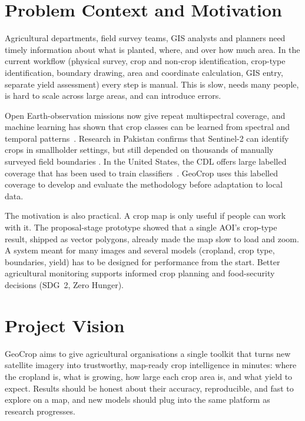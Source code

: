 \section{Problem Context and Motivation}
Agricultural departments, field survey teams, GIS analysts and planners need timely information
about what is planted, where, and over how much area. In the current workflow (physical survey,
crop and non-crop identification, crop-type identification, boundary drawing, area and coordinate
calculation, GIS entry, separate yield assessment) every step is manual. This is slow, needs many
people, is hard to scale across large areas, and can introduce errors.

Open Earth-observation missions now give repeat multispectral coverage, and machine learning has
shown that crop classes can be learned from spectral and temporal patterns~\cite{khan2023,
muqaddas2024,tran2022}. Research in Pakistan confirms that Sentinel-2 can identify crops in
smallholder settings, but still depended on thousands of manually surveyed field boundaries
\cite{khan2023}. In the United States, the CDL offers large labelled coverage that has been used to
train classifiers~\cite{hao2020,wang2020}. GeoCrop uses this labelled coverage to develop and
evaluate the methodology before adaptation to local data.

The motivation is also practical. A crop map is only useful if people can work with it. The
proposal-stage prototype showed that a single AOI's crop-type result, shipped as vector polygons,
already made the map slow to load and zoom. A system meant for many images and several models
(cropland, crop type, boundaries, yield) has to be designed for performance from the start. Better
agricultural monitoring supports informed crop planning and food-security decisions (SDG~2,
Zero Hunger).

\section{Project Vision}
GeoCrop aims to give agricultural organisations a single toolkit that turns new satellite imagery
into trustworthy, map-ready crop intelligence in minutes: where the cropland is, what is growing,
how large each crop area is, and what yield to expect. Results should be honest about their
accuracy, reproducible, and fast to explore on a map, and new models should plug into the same
platform as research progresses.

